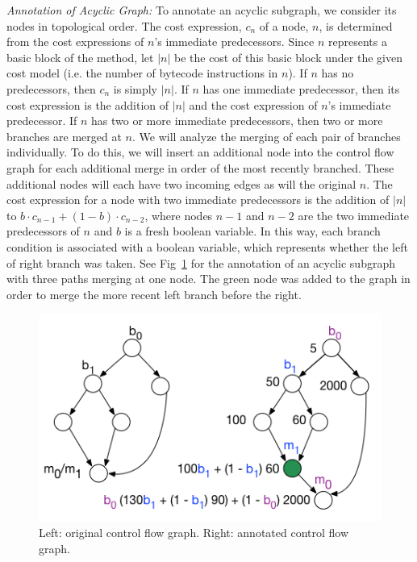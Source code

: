 \textit{Annotation of Acyclic Graph:} To annotate an acyclic subgraph, we consider its nodes in topological order. The cost expression, $c_n$ of a node, $n$, is determined from the cost expressions of $n$'s immediate predecessors. Since $n$ represents a basic block of the method, let $|n|$ be the cost of this basic block under the given cost model (i.e. the number of bytecode instructions in $n$).  If $n$ has no predecessors, then $c_n$ is simply $|n|$.  If $n$ has one immediate predecessor, then its cost expression is the addition of $|n|$ and the cost expression of $n$'s immediate predecessor. If $n$ has two or more immediate predecessors, then two or more branches are merged at $n$. We will analyze the merging of each pair of branches individually. To do this, we will insert an additional node into the control flow graph for each additional merge in order of the most recently branched. These additional nodes will each have two incoming edges as will the original $n$. The cost expression for a node with two immediate predecessors is the addition of $|n|$ to $b \cdot c_{n-1} + (1 - b) \cdot c_{n-2}$, where nodes $n-1$ and $n-2$ are the two immediate predecessors of $n$ and $b$ is a fresh boolean variable. In this way, each branch condition is associated with a boolean variable, which represents whether the left of right branch was taken. See Fig~\ref{fig:merge} for the annotation of an acyclic subgraph with three paths merging at one node. The green node was added to the graph in order to merge the more recent left branch before the right. 

\begin{figure}
  \includegraphics[scale=.5]{merge_paths.png}
  \caption{Left: original control flow graph. Right: annotated control flow graph.}
  \label{fig:merge}
\end{figure}

